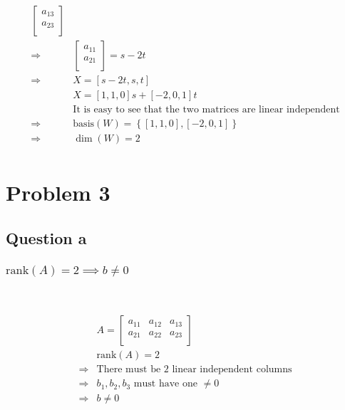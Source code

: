 \documentclass{article}
\def\rank{\text{rank}}
\begin{document}
\begin{equation*}
\begin{split}
\begin{bmatrix}
            a_{13}\\
            a_{23}\\
        \end{bmatrix}\\
        \Rightarrow &\begin{bmatrix}
            a_{11}\\
            a_{21}\\
        \end{bmatrix}=s-2t\\
        \Rightarrow&X=\left[s-2t,s,t\right]\\
        &X=[1,1,0]s+[-2,0,1]t\\
        &\text{It is easy to see that the two matrices are linear independent}\\
        \Rightarrow &\text{basis}(W)=\left\{[1,1,0],[-2,0,1]\right\}\\
        \Rightarrow &\dim(W)=2\\
    \end{split}
\end{equation*}

\newpage

\section{Problem 3}

\subsection{Question a}

\subsubsection{$\rank(A)=2\implies b\ne0$}

~

\begin{equation*}
    \begin{split}
        &A=\begin{bmatrix}
            a_{11}&a_{12}&a_{13}\\
            a_{21}&a_{22}&a_{23}\\
        \end{bmatrix}\\
        &\rank(A)=2\\
        \Rightarrow &\text{There must be 2 linear independent columns}\\
        \Rightarrow &b_1,b_2,b_3\text{ must have one }\ne 0\\
        \Rightarrow &b\ne0\\
    \end{split}
\end{equation*}
\end{document}
